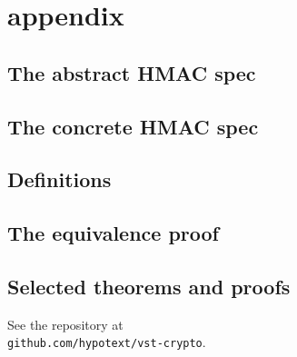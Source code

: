 \documentclass[twocolumn,showpacs,%
  nofootinbib,aps,superscriptaddress,%
  eqsecnum,prd,notitlepage,showkeys,10pt]{revtex4-1}
\begin{document}

\section{appendix}

\subsection{The abstract HMAC spec}



\subsection{The concrete HMAC spec}



\subsection{Definitions}







\subsection{The equivalence proof}



\subsection{Selected theorems and proofs}

See the repository at \\ \verb|github.com/hypotext/vst-crypto|.
\end{document}
